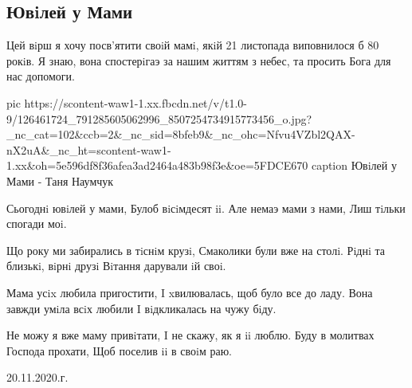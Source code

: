  
 
 

\subsection{Ювiлей у Мами}

Цей вiрш я хочу посв'ятити своiй мамi, якiй 21 листопада виповнилося б 80
рокiв.  Я знаю, вона спостерiгаэ за нашим життям з небес, та просить Бога для
нас допомоги.

\ifcmt
pic https://scontent-waw1-1.xx.fbcdn.net/v/t1.0-9/126461724_791285605062996_8507254734915773456_o.jpg?_nc_cat=102&ccb=2&_nc_sid=8bfeb9&_nc_ohc=Nfvu4VZbl2QAX-nX2uA&_nc_ht=scontent-waw1-1.xx&oh=5e596df8f36afea3ad2464a483b98f3e&oe=5FDCE670
caption Ювiлей у Мами - Таня Наумчук
\fi

Сьогоднi ювiлей у мами,
Булоб вiсiмдесят ii.
Але немаэ мами з нами,
Лиш тiльки спогади моi.

Що року ми забирались в тiснiм крузi,
Смаколики були вже на столi.
Рiднi та близькi, вiрнi друзi
Вiтання дарували iй своi.

Мама усix любила пригостити,
I xвилювалась, щоб було все до ладу.
Вона завжди умiла всiх любили
I вiдкликалась на чужу бiду.

Не можу я вже маму привiтати,
I не скажу, як я ii люблю.
Буду в молитвах Господа прохати,
Щоб поселив ii в своiм раю.

20.11.2020.г.
